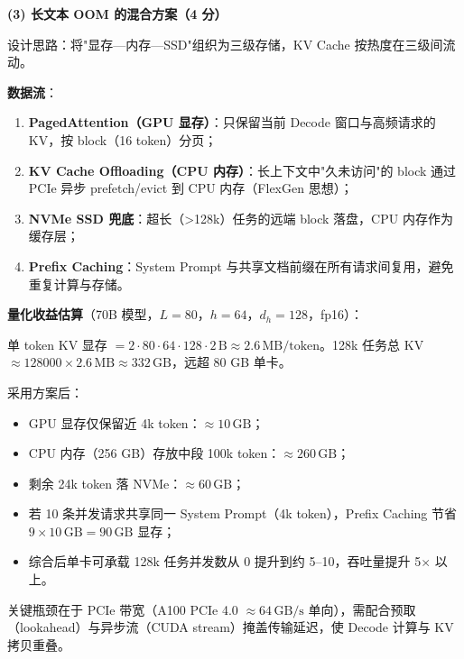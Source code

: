 \documentclass[11pt,a4paper]{article}
\begin{document}
\noindent\textbf{(3) 长文本 OOM 的混合方案（4 分）}

设计思路：将"显存—内存—SSD"组织为三级存储，KV Cache 按热度在三级间流动。

\textbf{数据流}：
\begin{enumerate}[leftmargin=2em,itemsep=0pt,parsep=0pt,topsep=0pt]
  \item \textbf{PagedAttention（GPU 显存）}：只保留当前 Decode 窗口与高频请求的 KV，按 block（16 token）分页；
  \item \textbf{KV Cache Offloading（CPU 内存）}：长上下文中"久未访问"的 block 通过 PCIe 异步 prefetch/evict 到 CPU 内存（FlexGen 思想）；
  \item \textbf{NVMe SSD 兜底}：超长（>128k）任务的远端 block 落盘，CPU 内存作为缓存层；
  \item \textbf{Prefix Caching}：System Prompt 与共享文档前缀在所有请求间复用，避免重复计算与存储。
\end{enumerate}

\textbf{量化收益估算}（70B 模型，$L=80$，$h=64$，$d_h=128$，fp16）：

单 token KV 显存 $=2\cdot 80\cdot 64\cdot 128\cdot 2\,\text{B} \approx 2.6\,\text{MB/token}$。128k 任务总 KV $\approx 128000\times 2.6\,\text{MB}\approx 332\,\text{GB}$，远超 80 GB 单卡。

采用方案后：
\begin{itemize}[leftmargin=2em,itemsep=0pt,parsep=0pt,topsep=0pt]
  \item GPU 显存仅保留近 4k token：$\approx 10\,\text{GB}$；
  \item CPU 内存（256 GB）存放中段 100k token：$\approx 260\,\text{GB}$；
  \item 剩余 24k token 落 NVMe：$\approx 60\,\text{GB}$；
  \item 若 10 条并发请求共享同一 System Prompt（4k token），Prefix Caching 节省 $9\times 10\,\text{GB}=90\,\text{GB}$ 显存；
  \item 综合后单卡可承载 128k 任务并发数从 0 提升到约 5--10，吞吐量提升 5$\times$ 以上。
\end{itemize}
关键瓶颈在于 PCIe 带宽（A100 PCIe 4.0 $\approx 64\,\text{GB/s}$ 单向），需配合预取（lookahead）与异步流（CUDA stream）掩盖传输延迟，使 Decode 计算与 KV 拷贝重叠。
\end{document}
